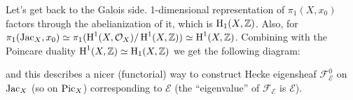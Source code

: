Let's get back to the Galois side.
1-dimensional representation of $\pi_1(X, x_0)$ factors through the abelianization of it, which is $\operatorname{\mathrm{H}}_1(X, \mathbb{Z})$.
Also, for $\pi_1(\operatorname{\mathrm{Jac}}_X, x_0) \simeq \pi_1(\operatorname{\mathrm{H}}^{1}(X, \mathcal{O}_X) / \operatorname{\mathrm{H}}^{1}(X, \mathbb{Z})) \simeq \operatorname{\mathrm{H}}^{1}(X, \mathbb{Z})$.
Combining with the Poincare duality $\operatorname{\mathrm{H}}^1(X, \mathbb{Z}) \simeq \operatorname{\mathrm{H}}_1(X, \mathbb{Z})$ we get the following diagram:
\begin{center}
\end{center}
and this describes a nicer (functorial) way to construct Hecke eigensheaf $\mathcal{F}_{\mathcal{E}}^{0}$ on $\operatorname{\mathrm{Jac}}_X$ (so on $\operatorname{\mathrm{Pic}}_X$) corresponding to $\mathcal{E}$ 
(the ``eigenvalue'' of $\mathcal{F}_\mathcal{E}$ is $\mathcal{E}$).

